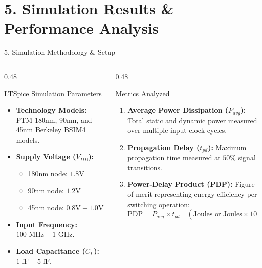 \documentclass[aspectratio=169,10pt]{beamer}
\begin{document}
\section{5. Simulation Results \& Performance Analysis}

\begin{frame}{5. Simulation Methodology \& Setup}
  \begin{columns}[T]
    \begin{column}{0.48\textwidth}
      \begin{block}{LTSpice Simulation Parameters}
        \begin{itemize}
          \item \textbf{Technology Models:} PTM 180nm, 90nm, and 45nm Berkeley BSIM4 models.
          \item \textbf{Supply Voltage ($V_{DD}$):}
            \begin{itemize}
              \item 180nm node: $1.8\text{V}$
              \item 90nm node: $1.2\text{V}$
              \item 45nm node: $0.8\text{V} - 1.0\text{V}$
            \end{itemize}
          \item \textbf{Input Frequency:} $100\text{ MHz} - 1\text{ GHz}$.
          \item \textbf{Load Capacitance ($C_L$):} $1\text{ fF} - 5\text{ fF}$.
        \end{itemize}
      \end{block}
    \end{column}
    \pause
    \begin{column}{0.48\textwidth}
      \begin{block}{Metrics Analyzed}
        \begin{enumerate}
          \item \textbf{Average Power Dissipation ($P_{avg}$):} Total static and dynamic power measured over multiple input clock cycles.
          \item \textbf{Propagation Delay ($t_{pd}$):} Maximum propagation time measured at $50\%$ signal transitions.
          \item \textbf{Power-Delay Product (PDP):} Figure-of-merit representing energy efficiency per switching operation:
            \[ \text{PDP} = P_{avg} \times t_{pd} \quad (\text{Joules or Joules}\times 10^{-18}) \]
        \end{enumerate}
      \end{block}
    \end{column}
  \end{columns}
\end{frame}
\end{document}
